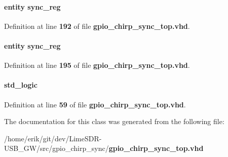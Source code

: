 \paragraph[{sync\+\_\+reg3}]{ {\bfseries \textcolor{keywordflow}{entity}\textcolor{vhdlchar}{ }\textcolor{vhdlchar}{sync\+\_\+reg}\textcolor{vhdlchar}{ }} \hspace{0.3cm}{\ttfamily [Instantiation]}}\label{classgpio__chirp__sync__top_1_1arch_a20af2a21d294a21228a5805525b852eb}


Definition at line {\bf 192} of file {\bf gpio\+\_\+chirp\+\_\+sync\+\_\+top.\+vhd}.

\paragraph[{sync\+\_\+reg4}]{ {\bfseries \textcolor{keywordflow}{entity}\textcolor{vhdlchar}{ }\textcolor{vhdlchar}{sync\+\_\+reg}\textcolor{vhdlchar}{ }} \hspace{0.3cm}{\ttfamily [Instantiation]}}\label{classgpio__chirp__sync__top_1_1arch_ab5fb1d0b0aabe7b2934f0691cf747050}


Definition at line {\bf 195} of file {\bf gpio\+\_\+chirp\+\_\+sync\+\_\+top.\+vhd}.

\paragraph[{trxiqpulse\+\_\+sync}]{ {\bfseries \textcolor{comment}{std\+\_\+logic}\textcolor{vhdlchar}{ }} \hspace{0.3cm}{\ttfamily [Signal]}}\label{classgpio__chirp__sync__top_1_1arch_a7bf2528cfe8db786cb369a00fc2a63cb}


Definition at line {\bf 59} of file {\bf gpio\+\_\+chirp\+\_\+sync\+\_\+top.\+vhd}.



The documentation for this class was generated from the following file\+:\begin{DoxyCompactItemize}
\item 
/home/erik/git/dev/\+Lime\+S\+D\+R-\/\+U\+S\+B\+\_\+\+G\+W/src/gpio\+\_\+chirp\+\_\+sync/{\bf gpio\+\_\+chirp\+\_\+sync\+\_\+top.\+vhd}\end{DoxyCompactItemize}

